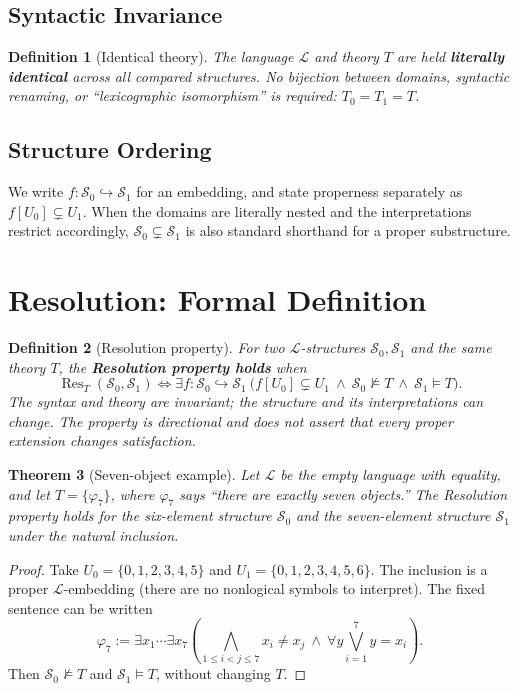 \documentclass[11pt]{article}
\newtheorem{definition}{Definition}
\newtheorem{theorem}[definition]{Theorem}
\newcommand{\Sat}{\models}
\newcommand{\NSat}{\not\models}
\newcommand{\Res}{\operatorname{Res}}
\newcommand{\Emb}{\hookrightarrow}
\begin{document}
\subsection{Syntactic Invariance}
\begin{definition}[Identical theory]
The language $\mathcal L$ and theory $T$ are held \textbf{literally identical} across all compared structures. No bijection between domains, syntactic renaming, or ``lexicographic isomorphism'' is required: $T_0=T_1=T$.
\end{definition}
\subsection{Structure Ordering}
We write $f:\mathcal S_0\Emb\mathcal S_1$ for an embedding, and state properness separately as $f[U_0]\subsetneq U_1$. When the domains are literally nested and the interpretations restrict accordingly, $\mathcal S_0\subsetneq\mathcal S_1$ is also standard shorthand for a proper substructure.

\section{Resolution: Formal Definition}
\begin{definition}[Resolution property]
For two $\mathcal L$-structures $\mathcal S_0,\mathcal S_1$ and the \emph{same} theory $T$, the \textbf{Resolution property holds} when
\[
\boxed{\Res_T(\mathcal S_0,\mathcal S_1)\iff
\exists f:\mathcal S_0\Emb\mathcal S_1\ \bigl(
 f[U_0]\subsetneq U_1\ \land\
 \mathcal S_0\NSat T\ \land\
 \mathcal S_1\Sat T\bigr).}
\]
The syntax and theory are invariant; the structure and its interpretations can change. The property is directional and does not assert that every proper extension changes satisfaction.
\end{definition}
\begin{theorem}[Seven-object example]
Let $\mathcal L$ be the empty language with equality, and let $T=\{\varphi_7\}$, where $\varphi_7$ says ``there are exactly seven objects.'' The Resolution property holds for the six-element structure $\mathcal S_0$ and the seven-element structure $\mathcal S_1$ under the natural inclusion.
\end{theorem}
\begin{proof}
Take $U_0=\{0,1,2,3,4,5\}$ and $U_1=\{0,1,2,3,4,5,6\}$. The inclusion is a proper $\mathcal L$-embedding (there are no nonlogical symbols to interpret). The fixed sentence can be written
\[
\varphi_7:=\exists x_1\cdots\exists x_7\left(
\bigwedge_{1\le i<j\le7}x_i\ne x_j\ \land\
\forall y\bigvee_{i=1}^7 y=x_i\right).
\]
Then $\mathcal S_0\NSat T$ and $\mathcal S_1\Sat T$, without changing $T$.
\end{proof}
\end{document}

